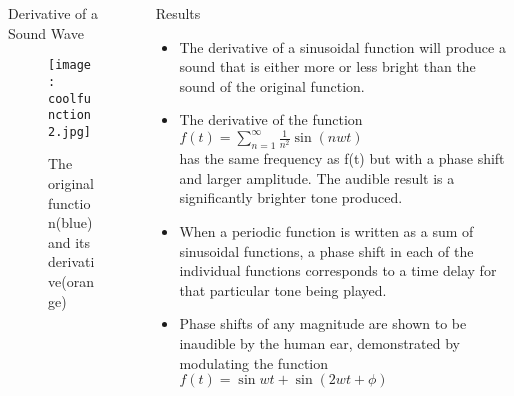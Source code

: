 \documentclass[leqno,presentation]{beamer}
\theoremstyle{definition}
\begin{document}
\begin{frame}
\begin{columns}[t]
\begin{column}{.45\linewidth}
\begin{columns}
\begin{column}{.49\linewidth}
\begin{block}{Derivative of a Sound Wave}
\begin{figure}
    \centering
   	\texttt{[image: coolfunction2.jpg]}
    \caption{The original function(blue) and its derivative(orange)}
    \label{sderivative}
\end {figure}
\end{block}
\end{column}
\end{columns}

\end{column}




\begin{column}{.25\linewidth}

\begin{block}{Results}
\vspace{1ex}
\begin{itemize}
\item The derivative of a sinusoidal function will produce a sound that is either more or less bright than the sound of the original function. 
\item The derivative of the function $f(t)=\sum_{n=1}^{\infty} \frac{1}{n^2}\sin{(nwt)}$\\ has the same frequency as f(t) but with a phase shift and larger amplitude. The audible result is a significantly brighter tone produced.
\item When a periodic function is written as a sum of sinusoidal functions, a phase shift in each of the individual functions corresponds to a time delay for that particular tone being played.
\item Phase shifts of any magnitude are shown to be inaudible by the human ear, demonstrated by modulating the function $f(t)=\sin{wt}+\sin{(2wt+\phi)}$\\
\end{itemize}
\end{block}


\end{column}
\end{columns}
\end{frame}
\end{document}
